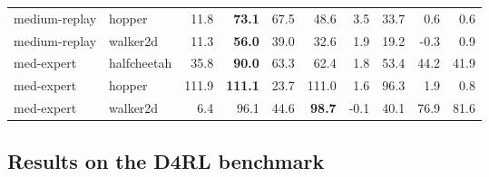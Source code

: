 \begin{table*}[t!]
\begin{tabular}{l|l|r|r|r|r|r|r|r|r}
\!\!\!medium-replay & hopper & 11.8 & \textbf{73.1} & 67.5  & 48.6 & 3.5 & 33.7 & 0.6 & 0.6 \\
\!\!\!medium-replay & walker2d & 11.3 & \textbf{56.0} & 39.0  & 32.6 & 1.9 & 19.2 & -0.3 & 0.9 \\
\!\!\!med-expert\!\!\! & halfcheetah & 35.8 & \textbf{90.0} & 63.3  & 62.4 & 1.8 & 53.4 & 44.2 & 41.9 \\
\!\!\!med-expert\!\!\! & hopper & 111.9  & \textbf{111.1} & 23.7  & 111.0 & 1.6 & 96.3 & 1.9 & 0.8 \\
\!\!\!med-expert\!\!\! & walker2d & 6.4 & 96.1 & 44.6  & \textbf{98.7} & -0.1 & 40.1 & 76.9 & 81.6\\
\bottomrule
\end{tabular}
\label{tbl:d4rl}
\normalsize
\vspace{-0.4cm}
\end{table*}


\vspace*{-5pt}
\subsection{Results on the D4RL benchmark}
\label{sec:d4rl_exps}


